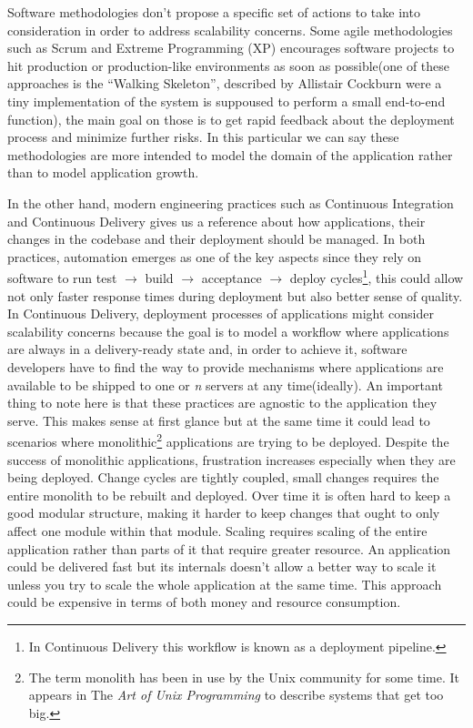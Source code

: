 \documentclass[10pt,article]{IEEEtran}
\begin{document}
Software methodologies don't propose a specific set of actions to take into consideration in order to address scalability concerns. Some agile methodologies such as Scrum and Extreme Programming (XP) encourages software projects to hit production or production-like environments as soon as possible(one of these approaches is the ``Walking Skeleton'', described by Allistair Cockburn\cite{cockburn} were a tiny implementation of the system is suppoused to perform a small end-to-end function), the main goal on those is to get rapid feedback about the deployment process and minimize further risks. In this particular we can say these methodologies are more intended to model the domain of the application rather than to model application growth.

In the other hand, modern engineering practices such as Continuous Integration and Continuous Delivery gives us a reference about how applications, their changes in the codebase and their deployment should be managed. In both practices, automation emerges as one of the key aspects since they rely on software to run test $\to$ build $\to$ acceptance $\to$ deploy cycles\footnote{In Continuous Delivery this workflow is known as a deployment pipeline.}, this could allow not only faster response times during deployment but also better sense of quality\cite{humble}. In Continuous Delivery, deployment processes of applications might consider scalability concerns because the goal is to model a workflow where applications are always in a delivery-ready state and, in order to achieve it, software developers have to find the way to provide mechanisms where applications are available to be shipped to one or \textit{n} servers at any time(ideally).
An important thing to note here is that these practices are agnostic to the application they serve. This makes sense at first glance but at the same time it could lead to scenarios where monolithic\footnote{The term monolith has been in use by the Unix community for some time. It appears in The \emph{Art of Unix Programming} to describe systems that get too big.} applications are trying to be deployed. Despite the success of monolithic applications, frustration increases especially when they are being deployed. Change cycles are tightly coupled, small changes requires the entire monolith to be rebuilt and deployed. Over time it is often hard to keep a good modular structure, making it harder to keep changes that ought to only affect one module within that module. Scaling requires scaling of the entire application rather than parts of it that require greater resource\cite{monolit:fowler}. An application could be delivered fast but its internals doesn't allow a better way to scale it unless you try to scale the whole application at the same time. This approach could be expensive in terms of both money and resource consumption. 
\end{document}
